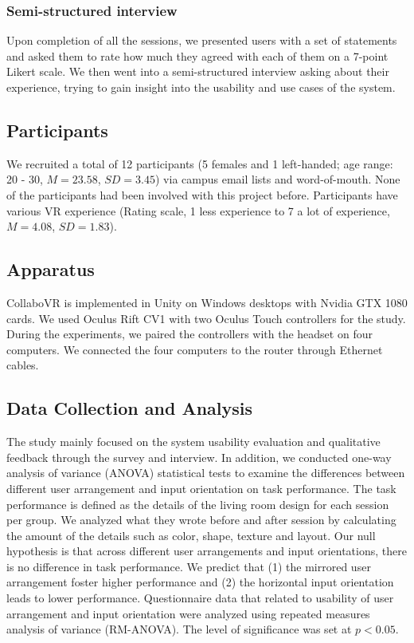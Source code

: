 \documentclass{sigchi}
\begin{document}
\subsubsection{Semi-structured interview}
Upon completion of all the sessions, we presented users with a set of statements and asked them to rate how much they agreed with each of them on a 7-point Likert scale. We then went into a semi-structured interview asking about their experience, trying to gain insight into the usability and use cases of the system.

\subsection{Participants}
We recruited a total of 12 participants (5 females and 1 left-handed; age range: 20 - 30, $M=23.58$, $SD=3.45$) via campus email lists and word-of-mouth. None of the participants had been involved with this project before. Participants have various VR experience (Rating scale, 1 less experience to 7 a lot of experience, $M=4.08$, $SD=1.83$).

\subsection{Apparatus}
CollaboVR is implemented in Unity on Windows desktops with Nvidia GTX 1080 cards. We used Oculus Rift CV1 with two Oculus Touch controllers for the study. During the experiments, we paired the controllers with the headset on four computers. We connected the four computers to the router through Ethernet cables.

\subsection{Data Collection and Analysis}
The study mainly focused on the system usability evaluation and qualitative feedback through the survey and interview. In addition, we conducted one-way analysis of variance (ANOVA) statistical tests to examine the differences between different user arrangement and input orientation on task performance. The task performance is defined as the details of the living room design for each session per group. We analyzed what they wrote before and after session by calculating the amount of the details such as color, shape, texture and layout. Our null hypothesis is that across different user arrangements and input orientations, there is no difference in task performance. We predict that (1) the mirrored user arrangement foster higher performance and (2) the horizontal input orientation leads to lower performance. Questionnaire data that related to usability of user arrangement and input orientation were analyzed using repeated measures analysis of variance (RM-ANOVA). The level of significance was set at $p<0.05$.
\end{document}
